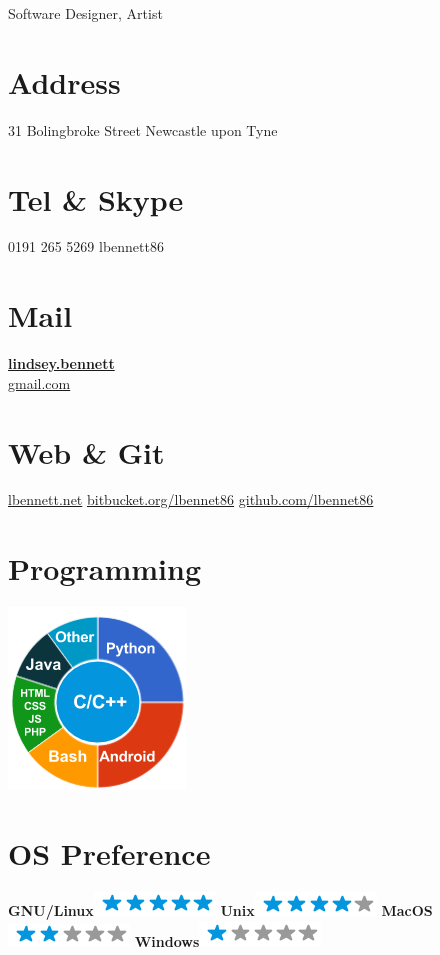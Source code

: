 \documentclass[]{friggeri-cv}
\begin{document}
      {Software Designer, Artist}
      

\begin{aside}
  \section{Address}
    31 Bolingbroke Street
    Newcastle upon Tyne
    ~
  \section{Tel \& Skype}
    0191 265 5269
    lbennett86
    ~
  \section{Mail}
    \href{mailto:lindsey.bennett@gmail.com}{\textbf{lindsey.bennett}\\gmail.com}
    ~
  \section{Web \& Git}
    \href{http://www.lbennett.net}{lbennett.net}
    \href{https://bitbucket.org/lbennet86}{bitbucket.org/lbennet86}
    \href{https://github.com/lbennet86}{github.com/lbennet86}
    ~
  \section{Programming}
    \includegraphics[scale=0.62]{img/programming.png}
    ~
  \section{OS Preference}
    \textbf{GNU/Linux}\includegraphics[scale=0.40]{img/5stars.png}
    \textbf{Unix}\includegraphics[scale=0.40]{img/4stars.png}
    \textbf{MacOS}\includegraphics[scale=0.40]{img/2stars.png}
    \textbf{Windows}\includegraphics[scale=0.40]{img/1stars.png}
    ~

\end{aside}
\end{document}
